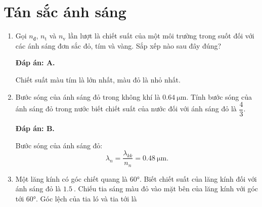 \whiteBGstarBegin
\setcounter{section}{0}
\section{Tán sắc ánh sáng}
\begin{enumerate}[label=\bfseries Câu \arabic*:]
	\item {} 
	
	\cauhoi
	{Gọi $n_\text{đ}$, $n_\text{t}$ và $n_\text{v}$ lần lượt là chiết suất của một môi trường trong suốt đối với các ánh sáng đơn sắc đỏ, tím và vàng. Sắp xếp nào sau đây đúng?
	}
	
	\loigiai
	{		\textbf{Đáp án: A.}
		
Chiết suất màu tím là lớn nhất, màu đỏ là nhỏ nhất.
		
	}
	
	\item {}
	
	\cauhoi
	{Bước sóng của ánh sáng đỏ trong không khí là $\SI{0.64}{\micro \meter}$. Tính bước sóng của ánh sáng đỏ trong nước biết chiết suất của nước đối với ánh sáng đỏ là $\dfrac{4}{3}$.
	}
	
	\loigiai
	{		\textbf{Đáp án: B.}
		
	Bước sóng của ánh sáng đỏ:
	$$
		\lambda_{n} = \dfrac{\lambda_{kk}}{n_{n}} = \SI{0.48}{\micro \meter}.
	$$
		
	}
	
	\item {} 
	
	\cauhoi
	{Một lăng kính có góc chiết quang là $\ang{60}$. Biết chiết suất của lăng kính đối với ánh sáng đỏ là $\SI{1.5}{}$. Chiếu tia sáng màu đỏ vào mặt bên của lăng kính với góc tới $\ang{60}$. Góc lệch của tia ló và tia tới là
	}
	

\end{enumerate}
